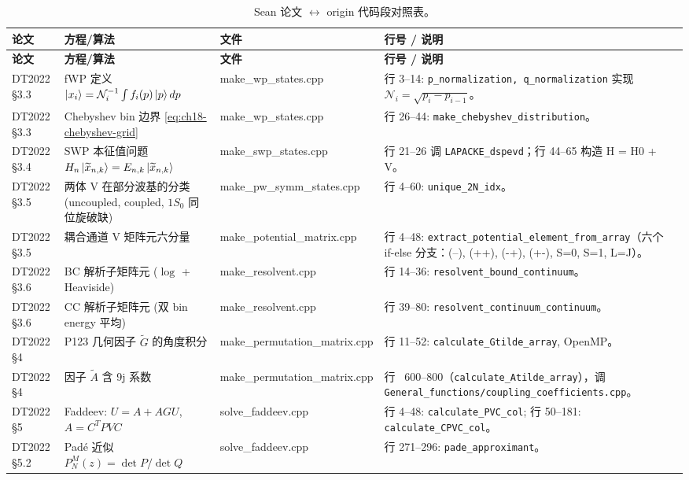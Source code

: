 \begin{longtable}{p{1.7cm}p{4.6cm}p{1.4cm}p{4.4cm}}
\caption{Sean 论文 $\leftrightarrow$ origin 代码段对照表。}
\label{tab:ch18-paper-source-mapping}\\
\toprule
\textbf{论文} & \textbf{方程/算法} & \textbf{文件} & \textbf{行号 / 说明} \\
\midrule
\endfirsthead
\toprule
\textbf{论文} & \textbf{方程/算法} & \textbf{文件} & \textbf{行号 / 说明} \\
\midrule
\endhead
DT2022 §3.3 & fWP 定义 \(\ket{x_{i}} = \mathcal{N}_i^{-1} \int f_i(p)\ket{p}dp\) & make\_wp\_states.cpp & 行 3--14: \texttt{p\_normalization, q\_normalization} 实现 \(\mathcal{N}_i = \sqrt{p_i - p_{i-1}}\)。\\
DT2022 §3.3 & Chebyshev bin 边界 \cref{eq:ch18-chebyshev-grid} & make\_wp\_states.cpp & 行 26--44: \texttt{make\_chebyshev\_distribution}。\\
DT2022 §3.4 & SWP 本征值问题 \(H_n \ket{\widetilde{x}_{n,k}} = E_{n,k}\ket{\widetilde{x}_{n,k}}\) & make\_swp\_states.cpp & 行 21--26 调 \texttt{LAPACKE\_dspevd}；行 44--65 构造 H = H0 + V。\\
DT2022 §3.5 & 两体 V 在部分波基的分类 (uncoupled, coupled, $1S_0$ 同位旋破缺) & make\_pw\_symm\_states.cpp & 行 4--60: \texttt{unique\_2N\_idx}。\\
DT2022 §3.5 & 耦合通道 V 矩阵元六分量 & make\_potential\_matrix.cpp & 行 4--48: \texttt{extract\_potential\_element\_from\_array}（六个 if-else 分支：(--), (++), (-+), (+-), S=0, S=1, L=J）。\\
DT2022 §3.6 & BC 解析子矩阵元 (\(\log\) + Heaviside) & make\_resolvent.cpp & 行 14--36: \texttt{resolvent\_bound\_continuum}。\\
DT2022 §3.6 & CC 解析子矩阵元 (双 bin energy 平均) & make\_resolvent.cpp & 行 39--80: \texttt{resolvent\_continuum\_continuum}。\\
DT2022 §4   & P123 几何因子 \(\tilde G\) 的角度积分 & make\_permutation\_matrix.cpp & 行 11--52: \texttt{calculate\_Gtilde\_array}, OpenMP。\\
DT2022 §4   & 因子 \(\tilde A\) 含 9j 系数 & make\_permutation\_matrix.cpp & 行 ~600--800（\texttt{calculate\_Atilde\_array}），调 \texttt{General\_functions/coupling\_coefficients.cpp}。\\
DT2022 §5   & Faddeev: \(U = A + AG U\), \(A = C^T PVC\) & solve\_faddeev.cpp & 行 4--48: \texttt{calculate\_PVC\_col}; 行 50--181: \texttt{calculate\_CPVC\_col}。\\
DT2022 §5.2 & Padé 近似 \(P_N^M(z) = \det P / \det Q\) & solve\_faddeev.cpp & 行 271--296: \texttt{pade\_approximant}。\\

\end{longtable}
